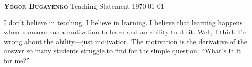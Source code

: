 \documentclass{./yb}
\begin{document}
\ybPrintPhoto{}

{\bfseries\scshape Yegor Bugayenko}\newline
Teaching Statement\newline
\today

I don't believe in teaching. I believe in learning. I believe that learning
happens when someone has a motivation to learn and an ability to do it.
Well, I think I'm wrong about the ability---just motivation.
The motivation is the derivative of the answer so many students
struggle to find for the simple question: ``What's in it for me?''
\end{document}
